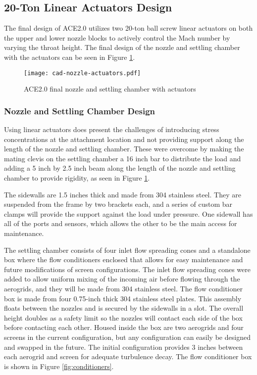 \subsection{20-Ton Linear Actuators Design}

The final design of ACE2.0 utilizes two 20-ton ball screw linear actuators on both the upper and lower nozzle blocks to actively control the Mach number by varying the throat height. The final design of the nozzle and settling chamber with the actuators can be seen in Figure \ref{fig:cad-nozzle-actuators}. 

\begin{figure}[ht!]
    \centering
    \texttt{[image: cad-nozzle-actuators.pdf]}
    \caption{ACE2.0 final nozzle and settling chamber with actuators}
    \label{fig:cad-nozzle-actuators}
\end{figure}

\subsubsection*{Nozzle and Settling Chamber Design}

Using linear actuators does present the challenges of introducing stress concentrations at the attachment location and not providing support along the length of the nozzle and settling chamber. These were overcome by making the mating clevis on the settling chamber a 16 inch bar to distribute the load and adding a 5 inch by 2.5 inch beam along the length of the nozzle and settling chamber to provide rigidity, as seen in Figure \ref{fig:cad-nozzle-actuators}.

The sidewalls are 1.5 inches thick and made from 304 stainless steel. They are suspended from the frame by two brackets each, and a series of custom bar clamps will provide the support against the load under pressure. One sidewall has all of the ports and sensors, which allows the other to be the main access for maintenance.

The settling chamber consists of four inlet flow spreading cones and a standalone box where the flow conditioners enclosed that allows for easy maintenance and future modifications of screen configurations. The inlet flow spreading cones were added to allow uniform mixing of the incoming air before flowing through the aerogrids, and they will be made from 304 stainless steel. The flow conditioner box is made from four 0.75-inch thick 304 stainless steel plates. This assembly floats between the nozzles and is secured by the sidewalls in a slot. The overall height doubles as a safety limit so the nozzles will contact each side of the box before contacting each other. Housed inside the box are two aerogrids and four screens in the current configuration, but any configuration can easily be designed and swapped in the future. The initial configuration provides 3 inches between each aerogrid and screen for adequate turbulence decay. The flow conditioner box is shown in Figure \ref{fig:conditioners}. 

